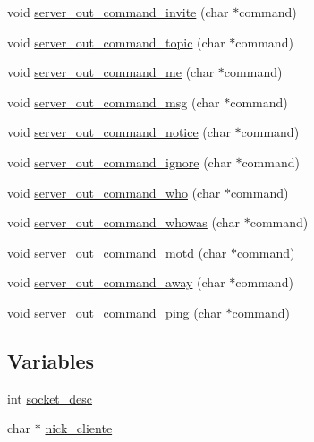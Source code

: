 \begin{DoxyCompactItemize}
\item 
void \hyperlink{G-2313-06-P2__client__function__handlers_8c_a6760491bb5560bf6db1e652022f0720f}{server\+\_\+out\+\_\+command\+\_\+invite} (char $\ast$command)
\item 
void \hyperlink{G-2313-06-P2__client__function__handlers_8c_affd97f456e87778153ec551468bb7f25}{server\+\_\+out\+\_\+command\+\_\+topic} (char $\ast$command)
\item 
void \hyperlink{G-2313-06-P2__client__function__handlers_8c_a9680c711ecaa492727c14a9c5d7e82ca}{server\+\_\+out\+\_\+command\+\_\+me} (char $\ast$command)
\item 
void \hyperlink{G-2313-06-P2__client__function__handlers_8c_ad2280719361affeaf8d3a663b48f0b3f}{server\+\_\+out\+\_\+command\+\_\+msg} (char $\ast$command)
\item 
void \hyperlink{G-2313-06-P2__client__function__handlers_8c_a6e05dad9592e0e473e84647cfe263034}{server\+\_\+out\+\_\+command\+\_\+notice} (char $\ast$command)
\item 
void \hyperlink{G-2313-06-P2__client__function__handlers_8c_a3b0bef634e60a6e59223cfb7e444fb36}{server\+\_\+out\+\_\+command\+\_\+ignore} (char $\ast$command)
\item 
void \hyperlink{G-2313-06-P2__client__function__handlers_8c_a4f8f2db21b7edd9e6b7fbad232ee27fd}{server\+\_\+out\+\_\+command\+\_\+who} (char $\ast$command)
\item 
void \hyperlink{G-2313-06-P2__client__function__handlers_8c_a74f475c007446256a2cbada71f51f30a}{server\+\_\+out\+\_\+command\+\_\+whowas} (char $\ast$command)
\item 
void \hyperlink{G-2313-06-P2__client__function__handlers_8c_ae721ae6a65ec5f0790d6b6883dcf94a5}{server\+\_\+out\+\_\+command\+\_\+motd} (char $\ast$command)
\item 
void \hyperlink{G-2313-06-P2__client__function__handlers_8c_ac0c8a1e0d4144fd3d78c124bad9228d6}{server\+\_\+out\+\_\+command\+\_\+away} (char $\ast$command)
\item 
void \hyperlink{G-2313-06-P2__client__function__handlers_8c_a3719651e6671245a46f4994fcf462c7d}{server\+\_\+out\+\_\+command\+\_\+ping} (char $\ast$command)
\end{DoxyCompactItemize}
\subsection*{Variables}
\begin{DoxyCompactItemize}
\item 
int \hyperlink{G-2313-06-P2__client__function__handlers_8c_adeadf7cb6916a10c7142ce7d265ab32a}{socket\+\_\+desc}
\item 
char $\ast$ \hyperlink{G-2313-06-P2__client__function__handlers_8c_ab93a317ee9a27c82844c9128a76b136a}{nick\+\_\+cliente}
\end{DoxyCompactItemize}


